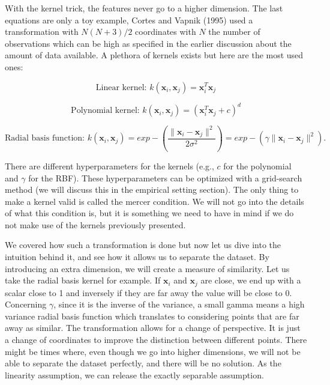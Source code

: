 \documentclass[a4paper,12pt]{article}
\numberwithin{equation}{section}
\begin{document}
With the kernel trick, the features never go to a higher dimension. The last equations are only a toy example, Cortes and Vapnik (1995) used a transformation with $N(N+3)/2$ coordinates with $N$ the number of observations which can be high as specified in the earlier discussion about the amount of data available. A plethora of kernels exists but here are the most used ones:

\begin{equation*}
\mbox{Linear kernel: } k(\boldsymbol{x}_i,\boldsymbol{x}_j) = \boldsymbol{x}^T_i\boldsymbol{x}_j
\end{equation*}

\begin{equation*}
\mbox{Polynomial kernel: } k(\boldsymbol{x}_i,\boldsymbol{x}_j) = (\boldsymbol{x}^T_i\boldsymbol{x}_j+c)^d
\end{equation*}


\begin{equation*}
\mbox{Radial basis function: } k(\boldsymbol{x}_i,\boldsymbol{x}_j) = exp-(\frac{\|\boldsymbol{x}_i -\boldsymbol{x}_j\|^2}{2\sigma^2}) = exp-(\gamma\|\boldsymbol{x}_i -\boldsymbol{x}_j\|^2).
\end{equation*}


There are different hyperparameters for the kernels (e.g., $c$ for the polynomial and $\gamma$ for the RBF). These hyperparameters can be optimized with a grid-search method (we will discuss this in the empirical setting section). The only thing to make a kernel valid is called the mercer condition. We will not go into the details of what this condition is, but it is something we need to have in mind if we do not make use of the kernels previously presented.

We covered how such a transformation is done but now let us dive into the intuition behind it, and see how it allows us to separate the dataset. By introducing an extra dimension, we will create a measure of similarity. Let us take the radial basis kernel for example. If $\boldsymbol{x}_i$ and $\boldsymbol{x}_j$ are close, we end up with a scalar close to 1 and inversely if they are far away the value will be close to 0. Concerning $\gamma$, since it is the inverse of the variance, a small gamma means a high variance radial basis function which translates to considering points that are far away as similar. The transformation allows for a change of perspective. It is just a change of coordinates to improve the distinction between different points. There might be times where, even though we go into higher dimensions, we will not be able to separate the dataset perfectly, and there will be no solution. As the linearity assumption, we can release the exactly separable assumption.
\end{document}
